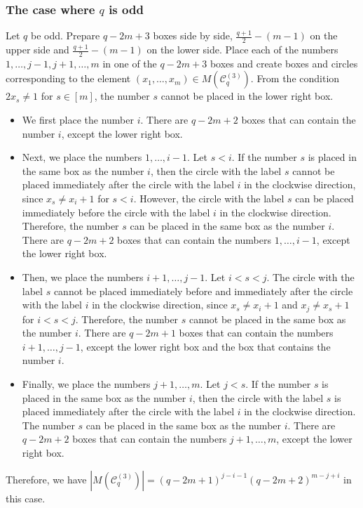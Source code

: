 \documentclass{article}
\theoremstyle{plain}
\theoremstyle{definition}
\theoremstyle{remark}
\numberwithin{equation}{section}
\newcommand{\Cc}{\mathcal{C}}
\begin{document}
\subsubsection{The case where $q$ is odd}\label{sec-TypeC-rest-x_i=x_j-odd}
Let $q$ be odd.
Prepare $q-2m+3$ boxes side by side, $\displaystyle \frac{q+1}{2}-(m-1)$ on the upper side and $\displaystyle \frac{q+1}{2}-(m-1)$ on the lower side.
Place each of the numbers $1,\dots,j-1,j+1,\dots,m$ in one of the $q-2m+3$ boxes and create boxes and circles corresponding to the element $(x_1,\dots,x_m)\in M(\Cc^{(3)}_q)$.
From the condition $2x_s\neq 1$ for $s\in[m]$, the number $s$ cannot be placed in the lower right box.
\begin{itemize}
\item We first place the number $i$.
There are $q-2m+2$ boxes that can contain the number $i$, except the lower right box.
\item Next, we place the numbers $1,\dots,i-1$. Let $s<i$.
If the number $s$ is placed in the same box as the number $i$, then the circle with the label $s$ cannot be placed immediately after the circle with the label $i$ in the clockwise direction, since $x_s\neq x_i+1$ for $s<i$.
However, the circle with the label $s$ can be placed immediately before the circle with the label $i$ in the clockwise direction.
Therefore, the number $s$ can be placed in the same box as the number $i$.
There are $q-2m+2$ boxes that can contain the numbers $1,\dots,i-1$, except the lower right box.
\item Then, we place the numbers $i+1,\dots,j-1$. Let $i<s<j$.
The circle with the label $s$ cannot be placed immediately before and immediately after the circle with the label $i$ in the clockwise direction, since $x_s\neq x_i+1$ and $x_j\neq x_s+1$ for $i<s<j$.
Therefore, the number $s$ cannot be placed in the same box as the number $i$.
There are $q-2m+1$ boxes that can contain the numbers $i+1,\dots,j-1$, except the lower right box and the box that contains the number $i$.
\item Finally, we place the numbers $j+1,\dots,m$. Let $j<s$.
If the number $s$ is placed in the same box as the number $i$, then the circle with the label $s$ is placed immediately after the circle with the label $i$ in the clockwise direction.
The number $s$ can be placed in the same box as the number $i$.
There are $q-2m+2$ boxes that can contain the numbers $j+1,\dots,m$, except the lower right box.
\end{itemize}
Therefore, we have $|M(\Cc^{(3)}_q)|=(q-2m+1)^{j-i-1}(q-2m+2)^{m-j+i}$ in this case.
\end{document}
